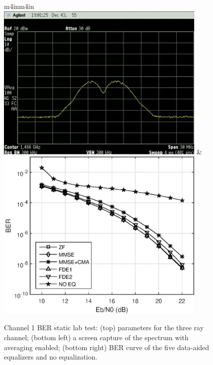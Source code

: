 \begin{figure}
\begin{center}
\begin{tabular}{m{4in}m{4in}}
\\[54pt]
\includegraphics[width=4in]{figures/eq_GPUimplementation/BER1.jpg}
&
\includegraphics[width=4in]{figures/eq_GPUimplementation/BER1.eps}
\end{tabular}
\end{center}
\caption{Channel 1 BER static lab test:
(top) parameters for the three ray channel;
(bottom left) a screen capture of the spectrum with averaging enabled;
(bottom right) BER curve of the five data-aided equalizers and no equalization.}
\label{fig:BER1}
\end{figure}

